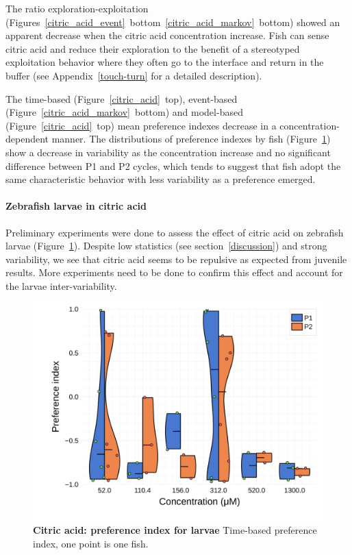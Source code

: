   The ratio exploration-exploitation (Figures~\ref{citric_acid_event}~bottom~\ref{citric_acid_markov}~bottom) showed an apparent decrease when the citric acid concentration increase. Fish can sense citric acid and reduce their exploration to the benefit of a stereotyped exploitation behavior where they often go to the interface and return in the buffer (see Appendix~\ref{touch-turn} for a detailed description).

  The time-based (Figure~\ref{citric_acid}~top), event-based (Figure~\ref{citric_acid_markov}~bottom) and model-based (Figure~\ref{citric_acid}~top) mean preference indexes decrease in a concentration-dependent manner. The distributions of preference indexes by fish (Figure~\ref{dist_citric_acid}) show a decrease in variability as the concentration increase and no significant difference between P1 and P2 cycles, which tends to suggest that fish adopt the same characteristic behavior with less variability as a preference emerged.

  \paragraph{Zebrafish larvae in citric acid} Preliminary experiments were done to assess the effect of citric acid on zebrafish larvae (Figure~\ref{dist_citric_acid}). Despite low statistics (see section~\ref{discussion}) and strong variability, we see that citric acid seems to be repulsive as expected from juvenile results. More experiments need to be done to confirm this effect and account for the larvae inter-variability.
    \begin{figure}[h!]
      \centering
      \includegraphics[width=1\textwidth]{part_2/assets/dist_citricacid_lar.png}
      \caption{\textbf{Citric acid: preference index for larvae} Time-based preference index, one point is one fish.}
      \label{dist_citric_acid}
    \end{figure}

